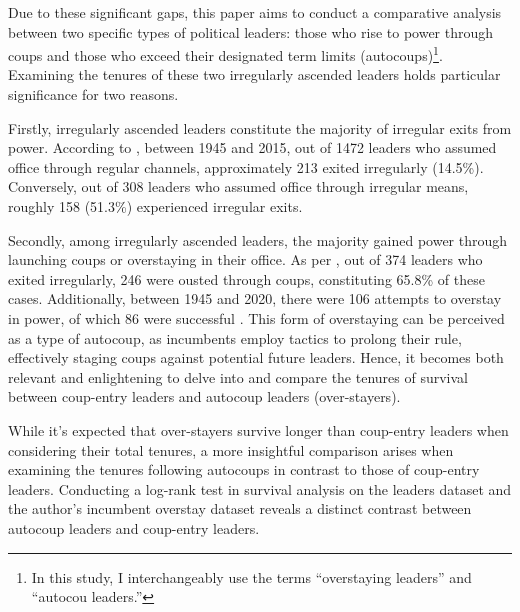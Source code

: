 \documentclass[
  12pt,
  a4paper,
  12pt]{article}
\begin{document}
Due to these significant gaps, this paper aims to conduct a comparative
analysis between two specific types of political leaders: those who rise
to power through coups and those who exceed their designated term limits
(autocoups)\footnote{In this study, I interchangeably use the terms
  ``overstaying leaders'' and ``autocou leaders.''}. Examining the
tenures of these two irregularly ascended leaders holds particular
significance for two reasons.

Firstly, irregularly ascended leaders constitute the majority of
irregular exits from power. According to \citet{goemans2009}, between
1945 and 2015, out of 1472 leaders who assumed office through regular
channels, approximately 213 exited irregularly (14.5\%). Conversely, out
of 308 leaders who assumed office through irregular means, roughly 158
(51.3\%) experienced irregular exits.

Secondly, among irregularly ascended leaders, the majority gained power
through launching coups or overstaying in their office. As per
\citep{goemans2009}, out of 374 leaders who exited irregularly, 246 were
ousted through coups, constituting 65.8\% of these cases. Additionally,
between 1945 and 2020, there were 106 attempts to overstay in power, of
which 86 were successful \citep{zhu2024}. This form of overstaying can
be perceived as a type of autocoup, as incumbents employ tactics to
prolong their rule, effectively staging coups against potential future
leaders. Hence, it becomes both relevant and enlightening to delve into
and compare the tenures of survival between coup-entry leaders and
autocoup leaders (over-stayers).

While it's expected that over-stayers survive longer than coup-entry
leaders when considering their total tenures, a more insightful
comparison arises when examining the tenures following autocoups in
contrast to those of coup-entry leaders. Conducting a log-rank test in
survival analysis on the leaders dataset \citep{goemans2009} and the
author's incumbent overstay dataset \citep{zhu2024} reveals a distinct
contrast between autocoup leaders and coup-entry leaders.
\end{document}
